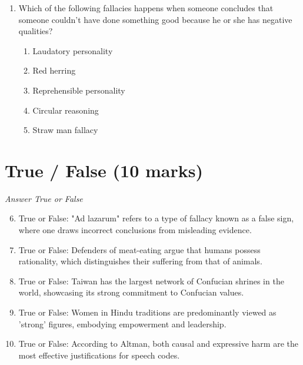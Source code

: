 \documentclass[12pt]{article}
\begin{document}
\begin{enumerate}[label=\arabic*.]
\begin{enumerate}[label=(\alph*)]
    \item strong
    \item reliant on circular reasoning
    \item too complicated
    \item overly simplistic
    \item biased in favor of Cleanthes' conclusion
\end{enumerate}
\item Which of the following fallacies happens when someone concludes that someone couldn't have done something good because he or she has negative qualities?
\begin{enumerate}[label=(\alph*)]
    \item Laudatory personality
    \item Red herring
    \item Reprehensible personality
    \item Circular reasoning
    \item Straw man fallacy
\end{enumerate}
\end{enumerate}

\section*{True / False (10 marks)}
\textit{Answer True or False}
\begin{enumerate}[label=\arabic*.]
\setcounter{enumi}{5}
\item True or False: "Ad lazarum" refers to a type of fallacy known as a false sign, where one draws incorrect conclusions from misleading evidence.
\item True or False: Defenders of meat-eating argue that humans possess rationality, which distinguishes their suffering from that of animals.
\item True or False: Taiwan has the largest network of Confucian shrines in the world, showcasing its strong commitment to Confucian values.
\item True or False: Women in Hindu traditions are predominantly viewed as 'strong' figures, embodying empowerment and leadership.
\item True or False: According to Altman, both causal and expressive harm are the most effective justifications for speech codes.
\end{enumerate}
\end{document}
